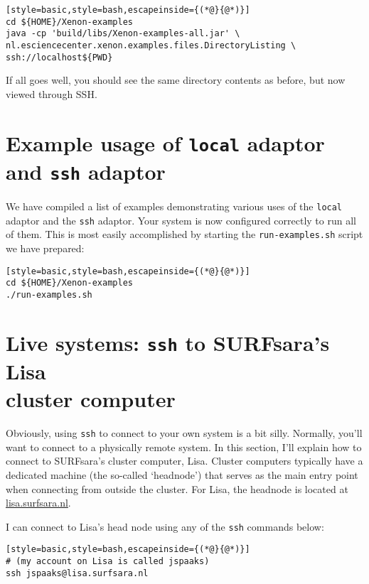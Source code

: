 \begin{lstlisting}[style=basic,style=bash,escapeinside={(*@}{@*)}]
cd ${HOME}/Xenon-examples
java -cp 'build/libs/Xenon-examples-all.jar' \
nl.esciencecenter.xenon.examples.files.DirectoryListing \
ssh://localhost${PWD}
\end{lstlisting} %

If all goes well, you should see the same directory contents as before, but now viewed through SSH.


\section{Example usage of \texttt{local} adaptor and \texttt{ssh} adaptor}

We have compiled a list of examples demonstrating various uses of the \texttt{local} adaptor and the \texttt{ssh} adaptor. Your system is now configured correctly to run all of them. This is most easily accomplished by starting the \texttt{run-examples.sh} script we have prepared:

\begin{lstlisting}[style=basic,style=bash,escapeinside={(*@}{@*)}]
cd ${HOME}/Xenon-examples
./run-examples.sh
\end{lstlisting} %

\section{Live systems: \texttt{ssh} to SURFsara's Lisa\\ cluster computer}

Obviously, using \texttt{ssh} to connect to your own system is a bit silly. Normally, you'll want to connect to a physically remote system. In this section, I'll explain how to connect to SURFsara's cluster computer, Lisa. Cluster computers typically have a dedicated machine (the so-called `headnode') that serves as the main entry point when connecting from outside the cluster. For Lisa, the headnode is located at \url{lisa.surfsara.nl}.

I can connect to Lisa's head node using any of the \texttt{ssh} commands below:
\begin{lstlisting}[style=basic,style=bash,escapeinside={(*@}{@*)}]
# (my account on Lisa is called jspaaks)
ssh jspaaks@lisa.surfsara.nl
\end{lstlisting}


